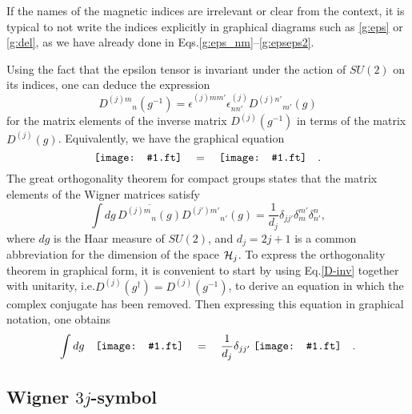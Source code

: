 \documentclass[graybox, secnum]{svmult}
\makeatletter
\newcommand{\ft}{pdf}        %
\newcommand{\makeSymbol}[1]{\mathord{\vcenter{\hbox{#1}}}}
\newcommand{\Symbol}[1]{\makeSymbol{\texttt{[image: \#1.\\ft]}}}
\newcommand{\ie}{i.e.\@\xspace}
\newcommand{\Eq}[1]{Eq.\@\xspace\eqref{#1}}
\newcommand{\Eqs}[1]{Eqs.\@\xspace\eqref{#1}}
\newcommand{\DD}[4]{{D^{(#1)#2}}_{#3}(#4)}
\makeatother
\begin{document}
If the names of the magnetic indices are irrelevant or clear from the context, it is typical to not write the indices explicitly in graphical diagrams such as \eqref{g:eps} or \eqref{g:del}, as we have already done in \Eqs{g:eps_nm}--\eqref{g:epseps2}.

Using the fact that the epsilon tensor is invariant under the action of $SU(2)$ on its indices, one can deduce the expression
\begin{equation}
	\DD{j}{m}{n}{g^{-1}} = \epsilon_{\phantom{m'}}^{(j)mm'}\epsilon^{(j)}_{nn'}\DD{j}{n'}{m'}{g}
	\label{D-inv}
\end{equation}
for the matrix elements of the inverse matrix $D^{(j)}(g^{-1})$ in terms of the matrix $D^{(j)}(g)$. Equivalently, we have the graphical equation
\begin{equation}
	\Symbol{Dginv} \quad = \quad \Symbol{epsDeps} \quad . 
	\label{}
\end{equation}
The great orthogonality theorem for compact groups states that the matrix elements of the Wigner matrices satisfy
\begin{equation}
	\int dg\,\overline{\displaystyle \DD{j}{m}{n}{g}} \DD{j'}{m'}{n'}{g} = \frac{1}{d_j}\delta_{jj'}\delta_m^{m'}\delta^n_{n'},
	\label{D-orth}
\end{equation}
where $dg$ is the Haar measure of $SU(2)$, and $d_j = 2j+1$ is a common abbreviation for the dimension of the space ${\cal H}_j$. To express the orthogonality theorem in graphical form, it is convenient to start by using \Eq{D-inv} together with unitarity, \ie $D^{(j)}(g^\dagger) = D^{(j)}(g^{-1})$, to derive an equation in which the complex conjugate has been removed. Then expressing this equation in graphical notation, one obtains
\begin{equation}
	\int dg\quad \Symbol{DD-vertical} \quad = \quad \frac{1}{d_j}\delta_{jj'}\;\Symbol{twoeps} \quad . 
	\label{g:intDD}
\end{equation}

\subsection{Wigner $3j$-symbol}
\label{sec:3j}
\end{document}
